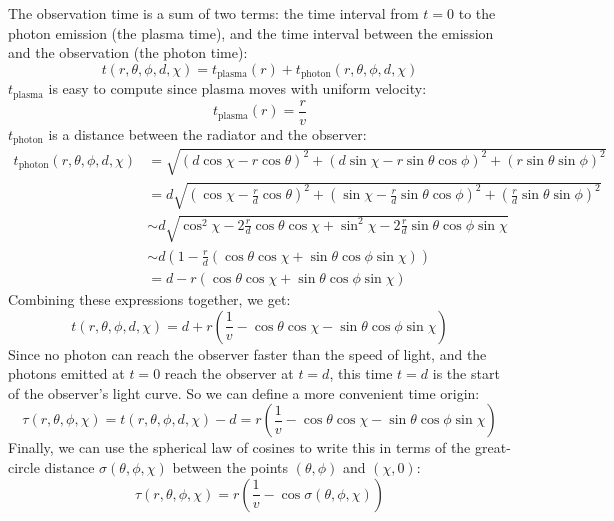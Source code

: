 \documentclass{article}
\begin{document}
The observation time is a sum of two terms: the time interval from $t = 0$ to the photon emission (the plasma time), and the time interval between the emission and the observation (the photon time):
\begin{equation*}
t\left(r, \theta, \phi, d, \chi\right) = t_\text{plasma}\left(r\right) + t_\text{photon}\left(r, \theta, \phi, d, \chi\right)
\end{equation*}
$t_\text{plasma}$ is easy to compute since plasma moves with uniform velocity:
\begin{equation*}
t_\text{plasma}\left(r\right) = \frac{r}{v}
\end{equation*}
$t_\text{photon}$ is a distance between the radiator and the observer:
\begin{align*}
t_\text{photon}\left(r, \theta, \phi, d, \chi\right) &= \sqrt{
	\left( d \cos\chi - r \cos\theta \right)^2 +
	\left( d \sin\chi - r \sin\theta \cos\phi \right)^2 +
	\left( r \sin\theta \sin\phi \right)^2
} \\
&= d\sqrt{
	\left( \cos\chi - \frac{r}{d} \cos\theta \right)^2 +
	\left( \sin\chi - \frac{r}{d} \sin\theta \cos\phi \right)^2 +
	\left(\frac{r}{d} \sin\theta \sin\phi \right)^2
} \\
&\sim d\sqrt{
	\cos^2{\chi} - 2\frac{r}{d} \cos\theta \cos\chi + \sin^2\chi - 2\frac{r}{d} \sin\theta \cos\phi \sin\chi
} \\
&\sim d\left(
	1 - 
	\frac{r}{d} \left( \cos\theta \cos\chi + \sin\theta \cos\phi \sin\chi \right)
\right) \\
&= d - r\left( \cos\theta \cos\chi + \sin\theta \cos\phi \sin\chi \right)
\end{align*}
Combining these expressions together, we get:
\begin{equation*}
t\left(r, \theta, \phi, d, \chi\right) = d + r\left( \frac{1}{v} - \cos\theta \cos\chi - \sin\theta \cos\phi \sin\chi \right)
\end{equation*}
Since no photon can reach the observer faster than the speed of light, and the photons emitted at $t = 0$ reach the observer at $t = d$, this time $t = d$ is the start of the observer's light curve. So we can define a more convenient time origin:
\begin{equation*}
\tau \left(r, \theta, \phi, \chi\right) = t\left(r, \theta, \phi, d, \chi\right) - d = r\left( \frac{1}{v} - \cos\theta \cos\chi - \sin\theta \cos\phi \sin\chi \right)
\end{equation*}
Finally, we can use the spherical law of cosines to write this in terms of the great-circle distance $\sigma\left( \theta, \phi, \chi \right)$ between the points $\left( \theta, \phi \right)$ and $\left( \chi, 0 \right)$:
\begin{equation}
\tau \left(r, \theta, \phi, \chi\right) = r\left( \frac{1}{v} - \cos\sigma\left( \theta, \phi, \chi \right) \right)
\end{equation}
\end{document}

